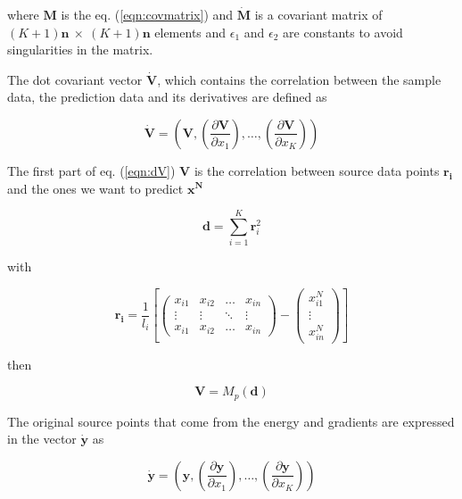 \documentclass[aps,prb,twocolumn,superscriptaddress,floatfix,longbibliography,10pt]{revtex4-2}
\begin{document}
where $\mathbf{M}$ is the eq. (\ref{eqn:covmatrix}) and $\mathbf{\dot M}$ is a covariant matrix of $(K+1)\mathbf{n} \: \times \: (K+1)\mathbf{n}$ elements and $\epsilon_1$ and $\epsilon_2$ are constants to avoid singularities in the matrix.

The dot covariant vector $\mathbf{\dot V}$, which contains the correlation between the sample data, the prediction data and its derivatives are defined as 

\begin{equation} \label{eqn:dV}
\mathbf{\dot V} = \left(\mathbf{V},\left(\frac{\partial\mathbf{V}}{\partial x_1}\right),\dots,\left(\frac{\partial\mathbf{V}}{\partial x_K}\right)\right)
\end{equation} 

The first part of eq. (\ref{eqn:dV}) $\mathbf{V}$ is the correlation between source data points $\mathbf{r_i}$ and the ones we want to predict $\mathbf{x}^\mathbf{N}$ 

\begin{equation} \label{eqn:CVdr}
\mathbf{d} = \sum^K_{i=1}\mathbf{r}_i^2
\end{equation}

with

\begin{equation} \label{eqn:xdataV}
\mathbf{r_i} = \frac{1}{l_i}\left[
\begin{pmatrix}
x_{i1} & x_{i2} & \dots  & x_{in} \\
\vdots & \vdots & \ddots & \vdots \\
x_{i1} & x_{i2} & \dots  & x_{in}
\end{pmatrix}
-
\begin{pmatrix}
x_{i1}^N  \\
\vdots  \\
x_{in}^N 
\end{pmatrix}
\right]
\end{equation}

then

\begin{equation} \label{eqn:Vdr}
\mathbf{V} = M_p\left(\mathbf{d}\right)
\end{equation}

The original source points that come from the energy and gradients are expressed in the vector $\mathbf{\dot y}$ as 

\begin{equation} \label{eqn:ydy}
\mathbf{\dot y} = \left(\mathbf{y},\left(\frac{\partial\mathbf{y}}{\partial x_1}\right),\dots,\left(\frac{\partial\mathbf{y}}{\partial x_K}\right)\right)
\end{equation}
\end{document}

